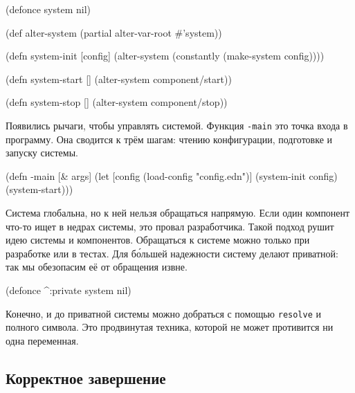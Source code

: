 
\begin{english}
  \begin{clojure}
(defonce system nil)

(def alter-system (partial alter-var-root #'system))

(defn system-init [config]
  (alter-system (constantly (make-system config))))

(defn system-start []
  (alter-system component/start))

(defn system-stop []
  (alter-system component/stop))
  \end{clojure}
\end{english}


Появились рычаги, чтобы управлять системой. Функция \verb|-main| это точка
входа в программу. Она сводится к трём шагам: чтению конфигурации, подготовке и
запуску системы.

\begin{english}
  \begin{clojure}
(defn -main [& args]
  (let [config (load-config "config.edn")]
    (system-init config)
    (system-start)))
  \end{clojure}
\end{english}

Система глобальна, но к ней нельзя обращаться напрямую. Если один компонент
что-то ищет в недрах системы, это провал разработчика. Такой подход рушит идею
системы и компонентов. Обращаться к системе можно только при разработке или в
тестах. Для б\'{о}льшей надежности систему делают приватной: так мы обезопасим
её от обращения извне.


\begin{english}
  \begin{clojure}
(defonce ^:private system nil)
  \end{clojure}
\end{english}

Конечно, и до приватной системы можно добраться с помощью \verb|resolve| и
полного символа. Это продвинутая техника, которой не может противится ни одна
переменная.

\subsection{Корректное завершение}


